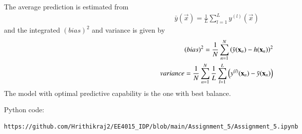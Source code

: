 \documentclass[journal,12pt,twocolumn]{IEEEtran}
\begin{document}
The average prediction is estimated from
\begin{align}
    \bar y(\vec{x}) = \frac{1}{L} \sum_{l=1}^{L} y^{(l)}(\vec{x})
\end{align}
and the integrated $(bias)^2$ and variance is given by
\begin{align}
    (bias)^2 = \frac{1}{N} \sum_{n=1}^{N} \left(\bar y(\mathbf{x}_{n}) - h(\mathbf{x}_{n})\right)^2\\
    variance = \frac{1}{N} \sum_{n=1}^{N} \frac{1}{L} \sum_{l=1}^{L} \left(y^{(l)}(\mathbf{x}_{n}) - \bar y(\mathbf{x}_{n})\right)
\end{align}
The model with optimal predictive capability is the one with best balance.

Python code:
\begin{lstlisting}
https://github.com/Hrithikraj2/EE4015_IDP/blob/main/Assignment_5/Assignment_5.ipynb
\end{lstlisting}
\end{document}
